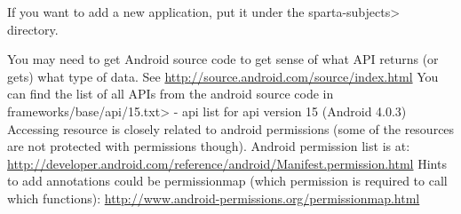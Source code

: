If you want to add a new application, put it under the
\<sparta-subjects> directory.

You may need to get Android source code to get sense of what API returns (or
gets) what type of data. See \url{http://source.android.com/source/index.html}
You can find the list of all APIs from the android source code in 
\<frameworks/base/api/15.txt> - api list for api version 15 (Android 4.0.3)
Accessing resource is closely related to android permissions (some of the
resources are not protected with permissions though). Android permission list
is at:
\url{http://developer.android.com/reference/android/Manifest.permission.html}
Hints to add annotations could be permissionmap (which permission is required
to call which functions):
\url{http://www.android-permissions.org/permissionmap.html}




